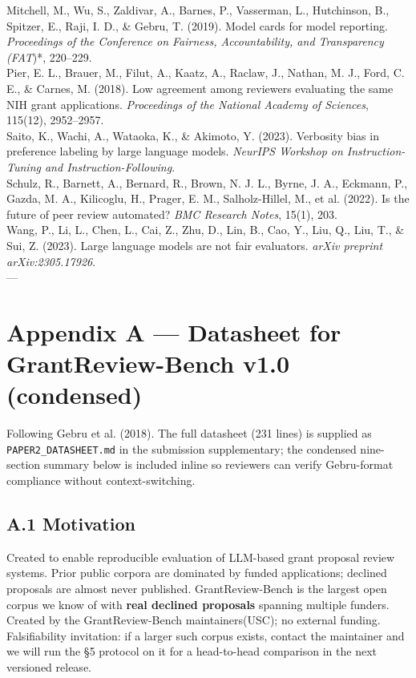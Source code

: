 \documentclass[11pt]{article}
\begin{document}
\noindent Mitchell, M., Wu, S., Zaldivar, A., Barnes, P., Vasserman, L., Hutchinson, B., Spitzer, E., Raji, I. D., \& Gebru, T. (2019). Model cards for model reporting. \emph{Proceedings of the Conference on Fairness, Accountability, and Transparency (FAT})*, 220--229.\\

\noindent Pier, E. L., Brauer, M., Filut, A., Kaatz, A., Raclaw, J., Nathan, M. J., Ford, C. E., \& Carnes, M. (2018). Low agreement among reviewers evaluating the same NIH grant applications. \emph{Proceedings of the National Academy of Sciences}, 115(12), 2952--2957.\\

\noindent Saito, K., Wachi, A., Wataoka, K., \& Akimoto, Y. (2023). Verbosity bias in preference labeling by large language models. \emph{NeurIPS Workshop on Instruction-Tuning and Instruction-Following}.\\

\noindent Schulz, R., Barnett, A., Bernard, R., Brown, N. J. L., Byrne, J. A., Eckmann, P., Gazda, M. A., Kilicoglu, H., Prager, E. M., Salholz-Hillel, M., et al. (2022). Is the future of peer review automated? \emph{BMC Research Notes}, 15(1), 203.\\

\noindent Wang, P., Li, L., Chen, L., Cai, Z., Zhu, D., Lin, B., Cao, Y., Liu, Q., Liu, T., \& Sui, Z. (2023). Large language models are not fair evaluators. \emph{arXiv preprint arXiv:2305.17926}.\\

\noindent ---\\

\normalsize
\section{Appendix A --- Datasheet for GrantReview-Bench v1.0 (condensed)}

Following Gebru et al. (2018). The full datasheet (231 lines) is supplied as \texttt{PAPER2\_DATASHEET.md} in the submission supplementary; the condensed nine-section summary below is included inline so reviewers can verify Gebru-format compliance without context-switching.

\subsection{A.1 Motivation}
Created to enable reproducible evaluation of LLM-based grant proposal review systems. Prior public corpora are dominated by funded applications; declined proposals are almost never published. GrantReview-Bench is the largest open corpus we know of with \textbf{real declined proposals} spanning multiple funders. Created by the GrantReview-Bench maintainers(USC); no external funding. Falsifiability invitation: if a larger such corpus exists, contact the maintainer and we will run the §5 protocol on it for a head-to-head comparison in the next versioned release.
\end{document}
